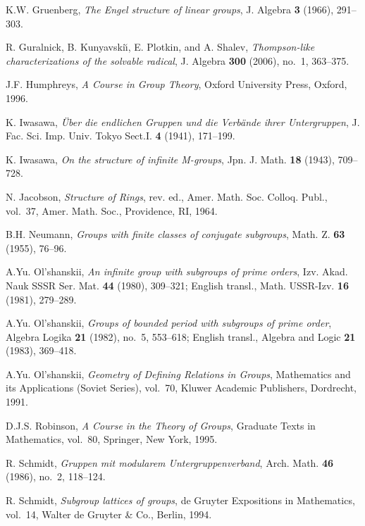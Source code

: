 \documentclass[11pt, reqno]{amsart}
\numberwithin{equation}{section}
\theoremstyle{definition}
\numberwithin{equation}{section}
\begin{document}
\begin{thebibliography}{}
 K.W. Gruenberg,
\emph{The Engel structure of linear groups},
J. Algebra \textbf{3} (1966), 291--303.

 R. Guralnick, B. Kunyavski\u{\i}, E. Plotkin, and A. Shalev, \emph{Thompson-like characterizations of the solvable radical}, J. Algebra \textbf{300} (2006), no.~1, 363--375.

 J.F. Humphreys, \emph{A Course in Group Theory}, Oxford University Press, Oxford, 1996. 

 K. Iwasawa, \emph{\"{U}ber die endlichen Gruppen und die Verb\"{a}nde ihrer Untergruppen}, J. Fac. Sci. Imp. Univ. Tokyo Sect.I. \textbf{4} (1941), 171--199.

 K. Iwasawa, \emph{On the structure of infinite M-groups}, Jpn. J. Math. \textbf{18} (1943), 709--728.

 N. Jacobson, \emph{Structure of Rings}, rev. ed., Amer. Math. Soc. Colloq. Publ., vol.~37, Amer. Math. Soc., Providence, RI, 1964.

 B.H. Neumann, \emph{Groups with finite classes of conjugate subgroups}, Math. Z. \textbf{63} (1955), 76--96.

 A.Yu. Ol'shanskii, \emph{An infinite group with subgroups of prime orders}, Izv. Akad. Nauk SSSR Ser. Mat. \textbf{44} (1980), 309--321; English transl., Math. USSR-Izv. \textbf{16} (1981), 279--289.

 A.Yu. Ol'shanskii, \emph{Groups of bounded period with subgroups of prime order}, Algebra Logika \textbf{21} (1982), no.~5,  553--618; English transl., Algebra and Logic \textbf{21} (1983), 369--418.

 A.Yu. Ol'shanskii, \emph{Geometry of Defining Relations in Groups}, Mathematics and its Applications (Soviet Series), vol.~70, Kluwer Academic Publishers, Dordrecht, 1991.

 D.J.S. Robinson, \emph{A Course in the Theory of Groups}, Graduate Texts in Mathematics, vol.~80, Springer, New York, 1995.

 R. Schmidt, \emph{Gruppen mit modularem Untergruppenverband},
Arch. Math. \textbf{46} (1986), no.~2, 118--124.

 R. Schmidt, \emph{Subgroup lattices of groups}, de Gruyter Expositions in Mathematics, vol.~14, Walter de Gruyter \& Co., Berlin, 1994.


\end{thebibliography}
\end{document}
